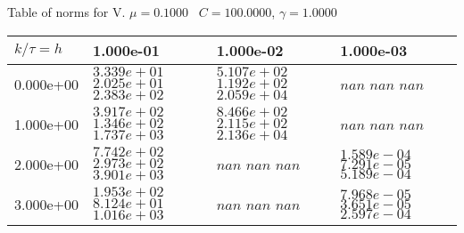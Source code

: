 \begin{center}
Table of norms for V. $\mu = 0.1000$ \, $C = 100.0000$, $\gamma = 1.0000$
  
\begin{tabular}{|p{1in}|p{1in}|p{1in}|p{1in}|} \hline
$k / \tau = h$ &1.000e-01 &1.000e-02 &1.000e-03 \\ \hline 
0.000e+00 & $3.339e+01$  $2.025e+01$  $2.383e+02$  & $5.107e+02$  $1.192e+02$  $2.059e+04$  & $nan$  $nan$  $nan$  \\ \hline 
1.000e+00 & $3.917e+02$  $1.346e+02$  $1.737e+03$  & $8.466e+02$  $2.115e+02$  $2.136e+04$  & $nan$  $nan$  $nan$  \\ \hline 
2.000e+00 & $7.742e+02$  $2.973e+02$  $3.901e+03$  & $nan$  $nan$  $nan$  & $1.589e-04$  $7.291e-05$  $5.189e-04$  \\ \hline 
3.000e+00 & $1.953e+02$  $8.124e+01$  $1.016e+03$  & $nan$  $nan$  $nan$  & $7.968e-05$  $3.651e-05$  $2.597e-04$  \\ \hline 

\end{tabular}\\[20pt]
\end{center}
